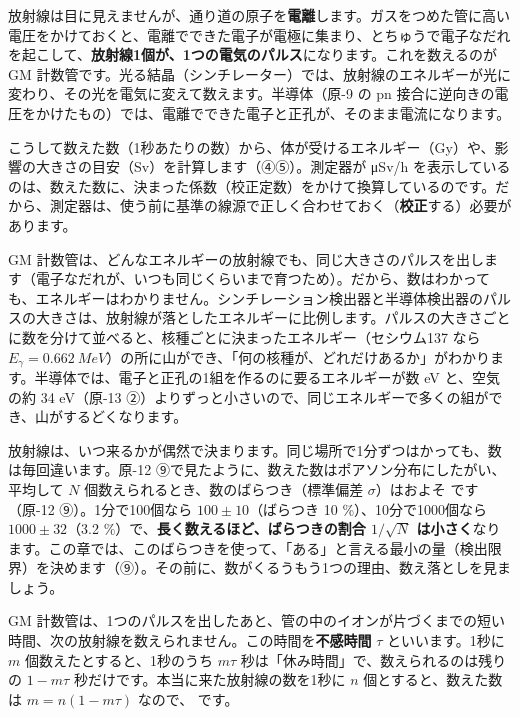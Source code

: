 \label{ph:原-14:hatena}放射線は目に見えませんが、通り道の原子を\textbf{電離}します。ガスをつめた管に高い電圧をかけておくと、電離でできた電子が電極に集まり、とちゅうで電子なだれを起こして、\textbf{放射線1個が、1つの電気のパルス}になります。これを数えるのが GM 計数管です。光る結晶（シンチレーター）では、放射線のエネルギーが光に変わり、その光を電気に変えて数えます。半導体（原-9 の pn 接合に逆向きの電圧をかけたもの）では、電離でできた電子と正孔が、そのまま電流になります。

こうして数えた数（1秒あたりの数）から、体が受けるエネルギー（Gy）や、影響の大きさの目安（Sv）を計算します（④⑤）。測定器が \si{\micro Sv/h} を表示しているのは、数えた数に、決まった係数（校正定数）をかけて換算しているのです。だから、測定器は、使う前に基準の線源で正しく合わせておく（\textbf{校正}する）必要があります。

GM 計数管は、どんなエネルギーの放射線でも、同じ大きさのパルスを出します（電子なだれが、いつも同じくらいまで育つため）。だから、数はわかっても、エネルギーはわかりません。シンチレーション検出器と半導体検出器のパルスの大きさは、放射線が落としたエネルギーに比例します。パルスの大きさごとに数を分けて並べると、核種ごとに決まったエネルギー（セシウム137 なら $E_\gamma=\qty{0.662}{MeV}$）の所に山ができ、「何の核種が、どれだけあるか」がわかります。半導体では、電子と正孔の1組を作るのに要るエネルギーが数 eV と、空気の約 34 eV（原-13 ②）よりずっと小さいので、同じエネルギーで多くの組ができ、山がするどくなります。

\label{ph:原-14:sec3}
放射線は、いつ来るかが偶然で決まります。同じ場所で1分ずつはかっても、数は毎回違います。原-12 ⑨で見たように、数えた数はポアソン分布にしたがい、平均して $N$ 個数えられるとき、数のばらつき（標準偏差 $\sigma$）はおよそ
\label{ph:原-14:sqrtN}です（原-12 ⑨）。1分で100個なら $100\pm10$（ばらつき 10 \%）、10分で1000個なら $1000\pm32$（3.2 \%）で、\textbf{長く数えるほど、ばらつきの割合 $1/\sqrt N$ は小さく}なります。この章では、このばらつきを使って、「ある」と言える最小の量（検出限界）を決めます（⑨）。その前に、数がくるうもう1つの理由、数え落としを見ましょう。

GM 計数管は、1つのパルスを出したあと、管の中のイオンが片づくまでの短い時間、次の放射線を数えられません。この時間を\textbf{不感時間} $\tau$ といいます。1秒に $m$ 個数えたとすると、1秒のうち $m\tau$ 秒は「休み時間」で、数えられるのは残りの $1-m\tau$ 秒だけです。本当に来た放射線の数を1秒に $n$ 個とすると、数えた数は $m=n(1-m\tau)$ なので、
\label{ph:原-14:fukan}です。


